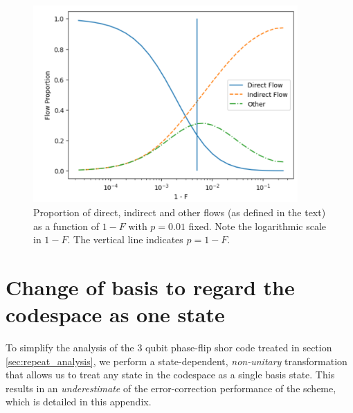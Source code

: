 \documentclass{report}
\begin{document}
\begin{appendices}
\begin{figure}[ht]
\begin{minipage}{0.45\textwidth}
        \includegraphics[width=0.9\textwidth]{Figures/flow/p_fixed.png} %
        \caption{Proportion of direct, indirect and other flows (as defined in the text) as a function of $1-F$ with $p = 0.01$ fixed. Note the logarithmic scale in $1-F$. The vertical line indicates $p = 1-F$.}
        \label{fig:flowprop2}
    \end{minipage}
\end{figure}

\chapter{Change of basis to regard the codespace as one state}\label{appendix:changeofbasis}
To simplify the analysis of the 3 qubit phase-flip shor code treated in section \ref{sec:repeat_analysis}, we perform a state-dependent, \textit{non-unitary} transformation that allows us to treat any state in the codespace as a single basis state. This results in an \textit{underestimate} of the error-correction performance of the scheme, which is detailed in this appendix.


\end{appendices}
\end{document}
